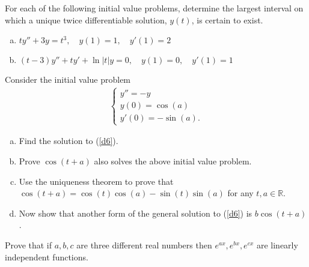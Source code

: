 \documentclass[12pt,letterpaper]{hmcpset}
\newcommand{\RR}{\mathbb{R}}
\begin{document}
\begin{solution}
    \vfill
\end{solution}
\clearpage

\begin{problem}[D5]
    For each of the following initial value problems,
    determine the largest interval on which a unique
    twice differentiable solution, $y(t)$, is certain 
    to exist.
    \begin{enumerate}[(a)]
        \item $ty'' + 3y = t^3,\quad y(1)=1,\quad y'(1)=2$
        \item $(t-3)y'' + ty' + \ln|t|y = 0, \quad
            y(1)=0,\quad y'(1)=1$
    \end{enumerate}
\end{problem}

\begin{solution}
    \vfill
\end{solution}
\clearpage

\begin{problem}[D6]
    Consider the initial value problem
    \begin{align}
        \begin{cases}
            y''=-y\\
            y(0) = \cos(a)\\
            y'(0) = -\sin(a).
        \end{cases}\label{d6}
    \end{align}
    \begin{enumerate}[(a)]
        \item Find the solution to (\ref{d6}).
        \item Prove $\cos(t + a)$ also solves the
            above initial value problem.
        \item Use the uniqueness theorem to prove 
            that $\cos(t + a) = \cos(t) \cos(a) - 
            \sin(t) \sin(a)$ for any $t,a\in\RR$.
        \item Now show that another form of the general
            solution to (\ref{d6}) is $b\cos(t+a)$.
    \end{enumerate}
\end{problem}

\begin{solution}
    \vfill
\end{solution}
\clearpage

\begin{problem}[D7]
    Prove that if $a, b, c$ are three different 
    real numbers then $e^{ax},e^{bx},e^{cx}$ are
    linearly independent functions.
\end{problem}
\end{document}
